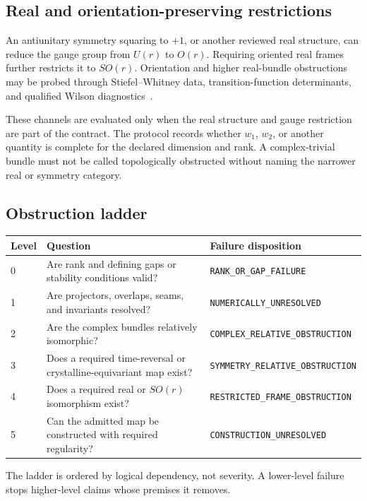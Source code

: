 \documentclass[11pt]{article}
\newenvironment{prospective}{\color{prospectivered}}{}
\begin{document}
\begin{prospective}
\subsection{Real and orientation-preserving restrictions}
An antiunitary symmetry squaring to $+1$, or another reviewed real structure, can reduce
the gauge group from $U(r)$ to $O(r)$. Requiring oriented real frames further restricts
it to $SO(r)$. Orientation and higher real-bundle obstructions may be probed through
Stiefel--Whitney data, transition-function determinants, and qualified Wilson
diagnostics~\cite{ahn2019}.

These channels are evaluated only when the real structure and gauge restriction are
part of the contract. The protocol records whether $w_1$, $w_2$, or another quantity is
complete for the declared dimension and rank. A complex-trivial bundle must not be
called topologically obstructed without naming the narrower real or symmetry category.

\subsection{Obstruction ladder}
\begin{center}\small
\begin{tabularx}{\textwidth}{p{}YY}
\toprule
\textbf{Level} & \textbf{Question} & \textbf{Failure disposition} \\
 & Are rank and defining gaps or stability conditions valid? & \nolinkurl{RANK_OR_GAP_FAILURE} \\
1 & Are projectors, overlaps, seams, and invariants resolved? & \nolinkurl{NUMERICALLY_UNRESOLVED} \\
2 & Are the complex bundles relatively isomorphic? & \nolinkurl{COMPLEX_RELATIVE_OBSTRUCTION} \\
3 & Does a required time-reversal or crystalline-equivariant map exist? & \nolinkurl{SYMMETRY_RELATIVE_OBSTRUCTION} \\
4 & Does a required real or $SO(r)$ isomorphism exist? & \nolinkurl{RESTRICTED_FRAME_OBSTRUCTION} \\
5 & Can the admitted map be constructed with required regularity? & \nolinkurl{CONSTRUCTION_UNRESOLVED} \\
\bottomrule
\end{tabularx}
\end{center}
The ladder is ordered by logical dependency, not severity. A lower-level failure stops
higher-level claims whose premises it removes.


\end{prospective}
\end{document}

